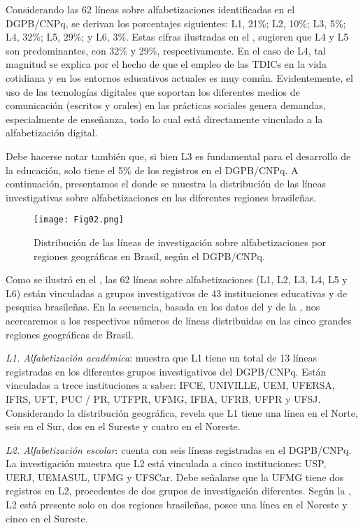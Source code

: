 \documentclass{textolivre}
\begin{document}
Considerando las 62 líneas sobre alfabetizaciones identificadas en el DGPB/CNPq, se derivan los porcentajes siguientes: L1, 21\%; L2, 10\%; L3, 5\%; L4, 32\%; L5, 29\%; y L6, 3\%. Estas cifras ilustradas en el , sugieren que L4 y L5 son predominantes, con 32\% y 29\%, respectivamente. En el caso de L4, tal magnitud se explica por el hecho de que el empleo de las TDICs en la vida cotidiana y en los entornos educativos actuales es muy común. Evidentemente, el uso de las tecnologías digitales que soportan los diferentes medios de comunicación (escritos y orales) en las prácticas sociales genera demandas, especialmente de enseñanza, todo lo cual está directamente vinculado a la alfabetización digital.  

Debe hacerse notar también que, si bien L3 es fundamental para el desarrollo de la educación, solo tiene el 5\% de los registros en el DGPB/CNPq. A continuación, presentamos el  donde se muestra la distribución de las líneas investigativas sobre alfabetizaciones en las diferentes regiones brasileñas.

\begin{figure}[htbp]
 \centering
 \texttt{[image: Fig02.png]}
 \caption{Distribución de las líneas de investigación sobre alfabetizaciones por regiones geográficas en Brasil, según el DGPB/CNPq.}
 \label{fig02}
\end{figure}

Como se ilustró en el , las 62 líneas sobre alfabetizaciones (L1, L2, L3, L4, L5 y L6) están vinculadas a grupos investigativos de 43 instituciones educativas y de pesquisa brasileñas. En la secuencia, basada en los datos del  y de la , nos acercaremos a los respectivos números de líneas distribuidas en las cinco grandes regiones geográficas de Brasil.

\textit{L1. Alfabetización académica}:  muestra que L1 tiene un total de 13 líneas registradas en los diferentes grupos investigativos del DGPB/CNPq. Están vinculadas a trece instituciones a saber: IFCE, UNIVILLE, UEM, UFERSA, IFRS, UFT, PUC / PR, UTFPR, UFMG, IFBA, UFRB, UFPR y UFSJ. Considerando la distribución geográfica,  revela que L1 tiene una línea en el Norte, seis en el Sur, dos en el Sureste y cuatro en el Noreste.

\textit{L2. Alfabetización escolar}: cuenta con seis líneas registradas en el DGPB/CNPq. La investigación muestra que L2 está vinculada a cinco instituciones: USP, UERJ, UEMASUL, UFMG y UFSCar. Debe señalarse que la UFMG tiene dos registros en L2, procedentes de dos grupos de investigación diferentes. Según la , L2 está presente solo en dos regiones brasileñas, posee una línea en el Noreste y cinco en el Sureste. 
\end{document}
